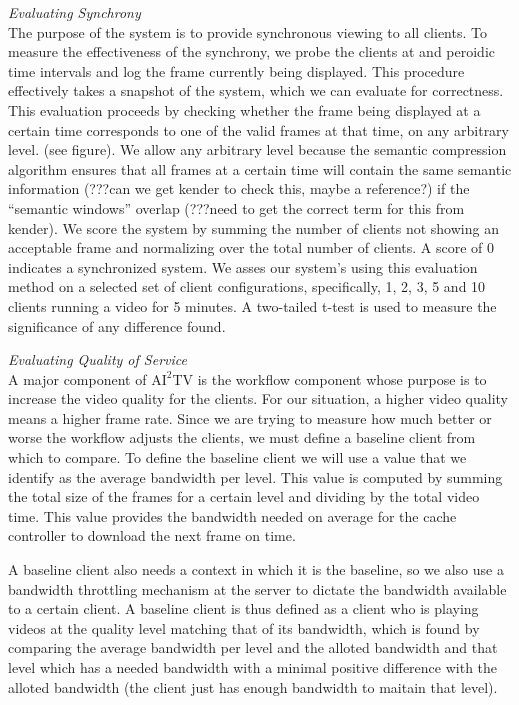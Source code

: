 \documentclass{sig-alternate}
\begin{document}
\textit{Evaluating Synchrony} \\ The purpose of the system is to
provide synchronous viewing to all clients.  To measure the
effectiveness of the synchrony, we probe the clients at and peroidic
time intervals and log the frame currently being displayed.  This
procedure effectively takes a snapshot of the system, which we can
evaluate for correctness.  This evaluation proceeds by checking
whether the frame being displayed at a certain time corresponds to one
of the valid frames at that time, on any arbitrary level.  (see
figure).  We allow any arbitrary level because the semantic
compression algorithm ensures that all frames at a certain time will
contain the same semantic information (???can we get kender to check
this, maybe a reference?) if the ``semantic windows'' overlap (???need
to get the correct term for this from kender).  We score the system by
summing the number of clients not showing an acceptable frame and
normalizing over the total number of clients.  A score of 0 indicates
a synchronized system.  We asses our system's using this evaluation
method on a selected set of client configurations, specifically, 1, 2,
3, 5 and 10 clients running a video for 5 minutes.  A two-tailed
t-test is used to measure the significance of any difference found.

\textit{Evaluating Quality of Service} \\
A major component of $\mathrm{AI}^2$TV is the workflow component whose
purpose is to increase the video quality for the clients.  For our
situation, a higher video quality means a higher frame rate.  Since we
are trying to measure how much better or worse the workflow adjusts
the clients, we must define a baseline client from which to compare.
To define the baseline client we will use a value that we identify as
the average bandwidth per level.  This value is computed by summing
the total size of the frames for a certain level and dividing by the
total video time.  This value provides the bandwidth needed on average
for the cache controller to download the next frame on time.

A baseline client also needs a context in which it is the baseline, so
we also use a bandwidth throttling mechanism \cite{shaperd} at the
server to dictate the bandwidth available to a certain client.  A
baseline client is thus defined as a client who is playing videos at
the quality level matching that of its bandwidth, which is found by
comparing the average bandwidth per level and the alloted bandwidth
and that level which has a needed bandwidth with a minimal positive
difference with the alloted bandwidth (the client just has enough
bandwidth to maitain that level).
\end{document}

